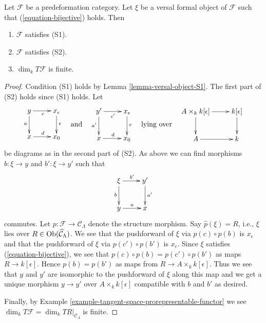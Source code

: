 \begin{lemma}
\label{lemma-miniversal-object-existence-1}
Let $\mathcal{F}$ be a predeformation category.
Let $\xi$ be a versal formal object of $\mathcal{F}$ such that
(\ref{equation-bijective}) holds. Then
\begin{enumerate}
\item $\mathcal{F}$ satisfies (S1).
\item $\mathcal{F}$ satisfies (S2).
\item $\dim_k T\mathcal{F}$ is finite.
\end{enumerate}
\end{lemma}

\begin{proof}
Condition (S1) holds by
Lemma \ref{lemma-versal-object-S1}.
The first part of (S2) holds since (S1) holds. Let
$$
\vcenter{
\xymatrix{
y \ar[r]_c \ar[d]_a & x_\epsilon \ar[d]^e \\
x \ar[r]^d          & x_0
}
}
\quad\text{and}\quad
\vcenter{
\xymatrix{
y' \ar[r]_{c'} \ar[d]_{a'} & x_\epsilon \ar[d]^e \\
x \ar[r]^d                 & x_0
}
}
\quad\text{lying over}\quad
\vcenter{
\xymatrix{
A \times_k k[\epsilon] \ar[r] \ar[d] & k[\epsilon] \ar[d] \\
A  \ar[r] & k
}
}
$$
be diagrams as in the second part of (S2). As above we can find
morphisms $b : \xi \to y$ and $b' : \xi \to y'$ such that
$$
\xymatrix{
\xi \ar[r]^{b'} \ar[d]_b          & y' \ar[d]^{a'} \\
y \ar[r]^{a} & x
}
$$
commutes. Let $p : \mathcal{F} \to \mathcal{C}_\Lambda$ denote the
structure morphism. Say $\widehat{p}(\xi) = R$, i.e., $\xi$ lies over
$R \in \mathop{\mathrm{Ob}}\nolimits(\widehat{\mathcal{C}}_\Lambda)$. We see that the
pushforward of $\xi$ via $p(c) \circ p(b)$ is $x_\epsilon$
and that the pushforward of $\xi$ via $p(c') \circ p(b')$ is $x_\epsilon$.
Since $\xi$ satisfies (\ref{equation-bijective}), we see that
$p(c) \circ p(b) = p(c') \circ p(b')$
as maps $R \to k[\epsilon]$. Hence $p(b) = p(b')$ as maps from
$R \to A \times_k k[\epsilon]$. Thus we see that $y$ and $y'$ are
isomorphic to the pushforward of $\xi$ along this map and we get
a unique morphism $y \to y'$ over $A \times_k k[\epsilon]$
compatible with $b$ and $b'$ as desired.

\medskip\noindent
Finally, by
Example \ref{example-tangent-space-prorepresentable-functor}
we see
$\dim_k T\mathcal{F} = \dim_k T\underline{R}|_{\mathcal{C}_\Lambda}$
is finite.
\end{proof}

